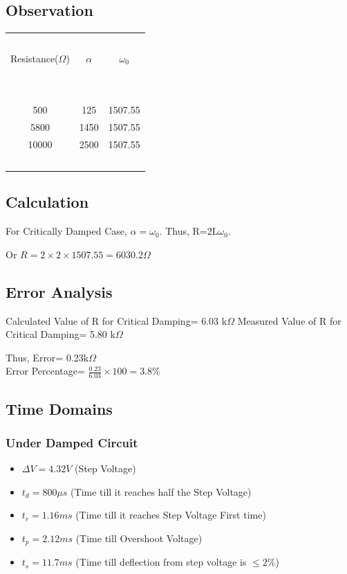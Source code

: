 \documentclass{article}
\begin{document}
\subsection{Observation}
\vspace{10px}
\begin{center}
\begin{tabular}{| c | c | c |} 
 \hline
    \ & \ & \ \\
    Resistance($\Omega$) & $\alpha$ & $\omega_0$ \\
    \ & \ & \ \\
    \hline
    \ & \ & \ \\
    500 & 125 & 1507.55 \\
    5800 & 1450 & 1507.55 \\
    10000 & 2500 & 1507.55 \\
    \ & \ & \ \\
    \hline
\end{tabular}
\end{center}
\vspace{10px}
\subsection{Calculation}
\vspace{10px}
For Critically Damped Case, $\alpha=\omega_0$. Thus, R=2L$\omega_0$.

\noindent
Or $R=2\times2\times1507.55 = 6030.2 \Omega$
\vspace{5px}
\subsection{Error Analysis}
Calculated Value of R for Critical Damping= 6.03 k$\Omega$
Measured Value of R for Critical Damping= 5.80 k$\Omega$ 
\vspace{5px}

\noindent
Thus, Error= 0.23k$\Omega$ \\
Error Percentage= $\frac{0.23}{6.03}\times 100 = 3.8 \%$

\newpage

\subsection{Time Domains}
\subsubsection{Under Damped Circuit}
\begin{itemize}
    \item $\Delta V = 4.32V$ (Step Voltage)
    \item $t_d = 800 \mu s$ (Time till it reaches half the Step Voltage)
    \item $t_r = 1.16 ms$ (Time till it reaches Step Voltage First time)
    \item $t_p = 2.12 ms$ (Time till Overshoot Voltage)
    \item $t_s = 11.7 ms$ (Time till deflection from step voltage is $\leq 2\%$)
\end{itemize}
\end{document}
